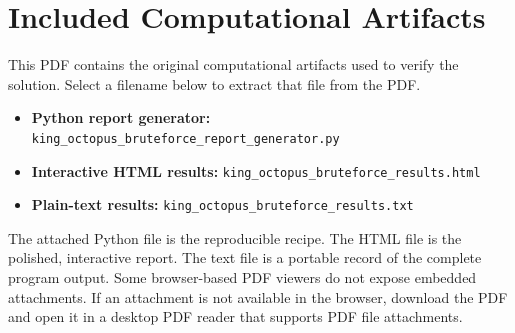 \documentclass[11pt]{article}
\begin{document}
\section*{Included Computational Artifacts} This PDF contains the original computational artifacts used to verify the solution. Select a filename below to extract that file from the PDF. \begin{itemize} \item \textbf{Python report generator:}  {\texttt{king\_octopus\_bruteforce\_report\_generator.py}} \item \textbf{Interactive HTML results:}  {\texttt{king\_octopus\_bruteforce\_results.html}} \item \textbf{Plain-text results:}  {\texttt{king\_octopus\_bruteforce\_results.txt}} \end{itemize} The attached Python file is the reproducible recipe. The HTML file is the polished, interactive report. The text file is a portable record of the complete program output. Some browser-based PDF viewers do not expose embedded attachments. If an attachment is not available in the browser, download the PDF and open it in a desktop PDF reader that supports PDF file attachments.
\end{document}
